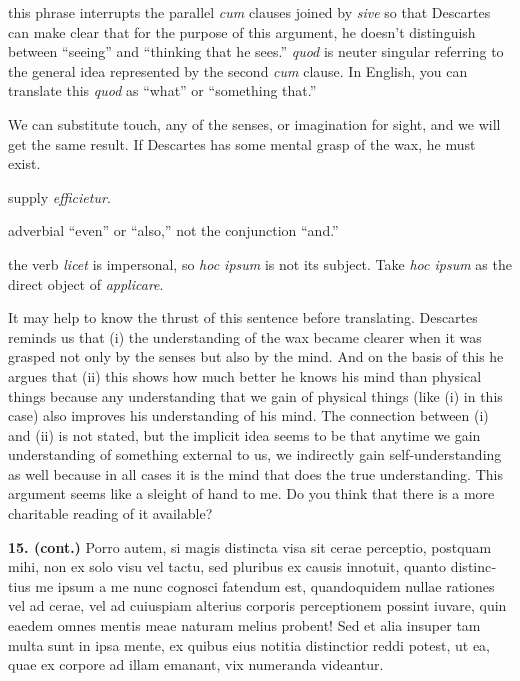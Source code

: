  this phrase interrupts the parallel \textit{cum} clauses joined by \textit{sive} so that Descartes can make clear that for the purpose of this argument, he doesn't distinguish between ``seeing'' and ``thinking that he sees.'' \textit{quod} is neuter singular referring to the general idea represented by the second \textit{cum} clause. In English, you can translate this \textit{quod} as ``what'' or ``something that.''

 We can substitute touch, any of the senses, or imagination for sight, and we will get the same result. If Descartes has some mental grasp  of the wax, he must exist.

 supply \textit{efficietur}.

 adverbial ``even'' or ``also,'' not the conjunction ``and.''

 the verb \textit{licet} is impersonal, so \textit{hoc ipsum} is not its subject. Take \textit{hoc ipsum} as the direct object of \textit{applicare}.

 It may help to know the thrust of this sentence before translating. Descartes reminds us that (i) the understanding of the wax became clearer when it was grasped not only by the senses but also by the mind. And on the basis of this he argues that (ii) this shows how much better he knows his mind than physical things because any understanding that we gain of physical things (like (i) in this case) also improves his understanding of his mind. The connection between (i) and (ii) is not stated, but the implicit idea seems to be that anytime we gain understanding of something external to us, we indirectly gain self-understanding as well because in all cases it is the mind that does the true understanding. This argument seems like a sleight of hand to me. Do you think that there is a more charitable reading of it available?

\clearpage

\beginnumbering
{}
\pstart
\begin{latin}
    \textenglish{\textbf{15. (cont.)}} Porro autem, si magis distincta visa sit cerae perceptio, postquam mihi, non ex solo visu vel tactu, sed pluribus ex causis innotuit, quanto distinctius me ipsum a me nunc cognosci fatendum est, quandoquidem nullae rationes vel ad cerae, vel ad cuiuspiam alterius corporis perceptionem possint iuvare, quin eaedem omnes mentis meae naturam melius probent! Sed et alia insuper tam multa sunt in ipsa mente, ex quibus eius notitia distinctior reddi potest, ut ea, quae ex corpore ad illam emanant, vix numeranda videantur.
\end{latin}
\pend
\endnumbering

